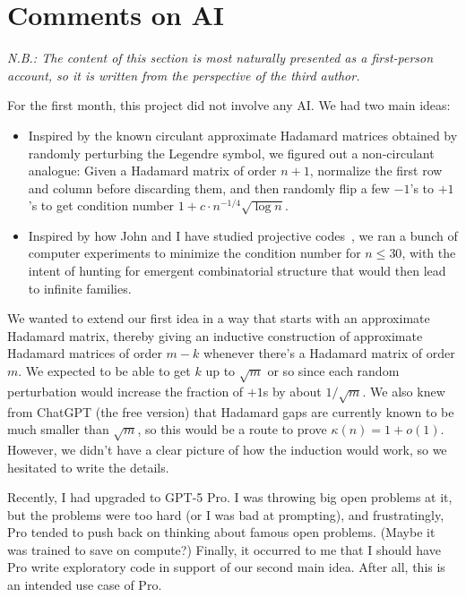 \documentclass[11pt]{article}
\theoremstyle{plain}
\theoremstyle{definition}
\begin{document}
\section{Comments on AI}
\label{sec.ai}

\textit{N.B.: The content of this section is most naturally presented as a first-person account, so it is written from the perspective of the third author.}

\medskip

\noindent
For the first month, this project did not involve any AI. 
We had two main ideas:
\begin{itemize}
\item[1.]
Inspired by the known circulant approximate Hadamard matrices obtained by randomly perturbing the Legendre symbol, we figured out a non-circulant analogue:
Given a Hadamard matrix of order $n+1$, normalize the first row and column before discarding them, and then randomly flip a few $-1$'s to $+1$'s to get condition number $1+c\cdot n^{-1/4}\sqrt{\log n}$.
\item[2.]
Inspired by how John and I have studied projective codes~\cite{JasperKM:19}, we ran a bunch of computer experiments to minimize the condition number for $n \leq 30$, with the intent of hunting for emergent combinatorial structure that would then lead to infinite families.
\end{itemize}

We wanted to extend our first idea in a way that starts with an approximate Hadamard matrix, thereby giving an inductive construction of approximate Hadamard matrices of order $m-k$ whenever there's a Hadamard matrix of order $m$. 
We expected to be able to get $k$ up to $\sqrt{m}$ or so since each random perturbation would increase the fraction of $+1$s by about $1/\sqrt{m}$. 
We also knew from ChatGPT (the free version) that Hadamard gaps are currently known to be much smaller than $\sqrt{m}$, so this would be a route to prove $\kappa(n)=1+o(1)$. 
However, we didn't have a clear picture of how the induction would work, so we hesitated to write the details.

Recently, I had upgraded to GPT-5 Pro.
I was throwing big open problems at it, but the problems were too hard (or I was bad at prompting), and frustratingly, Pro tended to push back on thinking about famous open problems.
(Maybe it was trained to save on compute?) 
Finally, it occurred to me that I should have Pro write exploratory code in support of our second main idea. 
After all, this is an intended use case of Pro.
\end{document}

